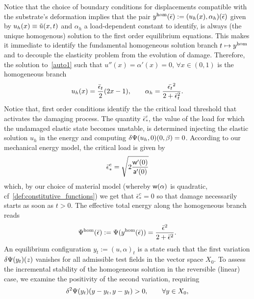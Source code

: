 Notice that the choice of boundary conditions for displacements compatible with the substrate's deformation implies that the pair $y^{\text{hom}}(\bar\epsilon):=(u_h(x), \alpha_h)(\bar\epsilon)$ given by $u_h(x)\equiv \tilde u(x, t)$ and $\alpha_h$ a load-dependent constant to identify, is always (the unique homogenous) solution to the first order equilibrium equations. This makes it immediate to identify the fundamental homogeneous solution branch $t \mapsto y^{\text{hom}}$ and to decouple the elasticity problem from the  evolution of damage. 
Therefore, the solution to~\eqref{auto1} such that $u''(x)=\alpha'(x)= 0, \, \forall x\in (0, 1)$ is the homogeneous branch
\begin{equation}
u_h(x) =  \frac{\bar \epsilon_t}{2}(2x-1),\qquad\alpha_h = \frac{\Bar{\epsilon_t}^2}{2 + \Bar\epsilon_t^2}\label{eq:homo1}.
\end{equation}
Notice that,  
first order conditions identify the the critical load threshold that activates the damaging process. The quantity $\bar\epsilon_*^c$, the value of the load for which the undamaged elastic state becomes unstable, is determined injecting the elastic solution $u_h$ in the energy and computing $\delta \Psi(u_h, 0)(0, \beta)=0$.
According to our mechanical energy model, the critical load is given by
\begin{equation}
    {{{\bar{\epsilon}^c}_*}} = \sqrt{2\frac{\mathsf{w}'(0)}{\mathsf{a}'(0)}} 
\end{equation}
% 
which, by our choice of material model (whereby $\mathsf{w}(\alpha)$ is quadratic, cf~\eqref{def:constitutive_functions}) we get that $\bar{\epsilon}^c_*=0$ so that damage necessarily starts as soon as $t>0$.
The effective {total} energy along the {homogeneous} branch reads  
\begin{equation}
    \label{eq:energy_homogeneous}
    \Psi^\text{hom}(\bar\epsilon) :=\Psi(y^{\text{hom}}(\bar\epsilon)) = \frac{\Bar{\epsilon}^2}{2 + \Bar\epsilon^2}.
\end{equation}
An equilibrium configuration $y_t:=(u,\alpha)_t$ is a state such that the first variation $\delta \Psi(y_t)(z)$ vanishes for all admissible test fields in the vector space $X_0$. 
To assess the incremental stability of the homogeneous solution in the reversible (linear) case, we examine the positivity of the second variation, requiring
\begin{equation}
\delta^2 \Psi(y_t)(y-y_t, y-y_t)>0, \qquad  \forall y\in X_0,
\label{eqn:linear_second_order_stability}
\end{equation} 
